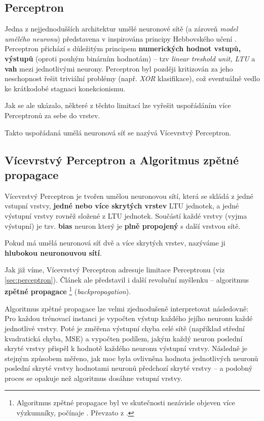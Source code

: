 \subsection{Perceptron}
\label{sec:perceptron}
Jedna z nejjednodušších architektur umělé neuronové sítě (a zároveň \emph{model umělého neuronu}) představena v \cite{Rosenblatt1957} inspirována principy Hebbovského učení \cite{Hebb1949}.
Perceptron přichází s důležitým principem \textbf{numerických hodnot vstupů, výstupů} (oproti pouhým binárním hodnotám) – tzv \emph{linear treshold unit, LTU} a \textbf{vah} mezi jednotlivými neurony. 
Perceptron byl později kritizován \cite{Minsky1969} za jeho neschopnost řešit triviální problémy (např. \emph{XOR} klasifikace), což eventuálně vedlo ke krátkodobé stagnaci konekcionismu.

Jak se ale ukázalo, některé z těchto limitací lze vyřešit uspořádáním více Perceptronů za sebe do vrstev. \cite{Rumelhart1987}

Takto uspořádaná umělá neuronová síť se nazývá Vícevrstvý Perceptron.

\subsection{Vícevrstvý Perceptron a Algoritmus zpětné propagace}
\label{sec:multilayer_perceptron}
Vícevrstvý Perceptron je tvořen umělou neuronovou sítí, která se skládá z jedné vstupní vrstvy, \textbf{jedné nebo více skrytých vrstev} LTU jednotek, a jedné výstupní vrstvy rovněž složené z LTU jednotek.
Součástí každé vrstvy (vyjma výstupní) je tzv. \textbf{bias} neuron který je \textbf{plně propojený} s další vrstvou sítě. \cite{Geron2019}

Pokud má umělá neuronová síť dvě a více skrytých vrstev, nazýváme ji \textbf{hlubokou neuronouvou sítí}.

Jak již víme, Vícevrstvý Perceptron adresuje limitace Perceptronu (viz \autoref{sec:perceptron}).
Článek \cite{Rumelhart1987} ale představil i další revoluční myšlenku – algoritmus \textbf{zpětné propagace}
\footnote{Algoritmus zpětné propagace byl ve skutečnosti nezávisle objeven více výzkumníky, počínaje \cite{Werbos1974}. Převzato z \cite{Geron2019}.} (\emph{backpropagation}).

Algoritmus zpětné propagace lze velmi zjednodušeně interpretovat následovně: Pro každou trénovací instanci je vypočten výstup každého jejího neuronu každé jednotlivé vrstvy.
Poté je změřena výstupní chyba celé sítě (například střední kvadratická chyba, MSE) a vypočten podílem, jakým každý neuron poslední skryté vrstvy přispěl k hodnotě každého neuronu výstupní vrstvy.
Následně je stejným způsobem měřeno, jak moc byla ovlivněna hodnota jednotlivých neuronů poslední skryté vrstvy hodnotami neuronů předchozí skryté vrstvy – a podobný proces se opakuje než algoritmus dosáhne vstupní vrstvy. \cite{Geron2019}


